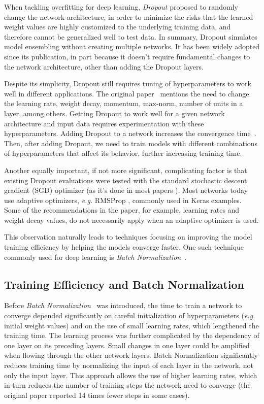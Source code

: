 \documentclass[../dropout-vs-batch-normalization.tex]{subfiles}
\begin{document}
When tackling overfitting for deep learning, \textit{Dropout} \cite{Srivastava2014} proposed to randomly change the network architecture, in order to minimize the risks that the learned weight values are highly customized to the underlying training data, and therefore cannot be generalized well to test data. In summary, Dropout simulates model ensembling without creating multiple networks. It has been widely adopted since its publication, in part because it doesn't require fundamental changes to the network architecture, other than adding the Dropout layers. 

Despite its simplicity, Dropout still requires tuning of hyperparameters to work well in different applications. The original paper~\cite{Srivastava2014} mentions the need to change the learning rate, weight decay, momentum, max-norm, number of units in a layer, among others. Getting Dropout to work well for a given network architecture and input data requires experimentation with these hyperparameters. Adding Dropout to a network increases the convergence time~\cite{Srivastava2014}. Then, after adding Dropout, we need to train models with different combinations of hyperparameters that affect its behavior, further increasing training time.

Another equally important, if not more significant, complicating factor is that existing Dropout evaluations were tested with the standard stochastic descent gradient (SGD) optimizer (as it's done in most papers \cite{Ruder2016}). Most networks today use adaptive optimizers, \textit{e.g.} RMSProp \cite{Tieleman2012}, commonly used in Keras examples. Some of the recommendations in the paper, for example, learning rates and weight decay values, do not necessarily apply when an adaptive optimizer is used.

This observation naturally leads to techniques focusing on improving the model training efficiency by helping the models converge faster. One such technique commonly used for deep learning is \textit{Batch Normalization}~\cite{Ioffe2015}.

\subsection{Training Efficiency and Batch Normalization}

Before \textit{Batch Normalization}~\cite{Ioffe2015} was introduced, the time to train a network to converge depended significantly on careful initialization of hyperparameters (\textit{e.g.} initial weight values) and on the use of small learning rates, which lengthened the training time. The learning process was further complicated by the dependency of one layer on its preceding layers. Small changes in one layer could be amplified when flowing through the other network layers. Batch Normalization significantly reduces training time by normalizing the input of each layer in the network, not only the input layer. This approach allows the use of higher learning rates, which in turn reduces the number of training steps the network need to converge (the original paper reported 14 times fewer steps in some cases).
\end{document}
